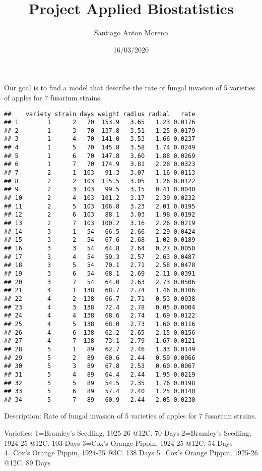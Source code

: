 \documentclass[
]{article}
\title{Project Applied Biostatistics}
\author{Santiago Anton Moreno}
\date{16/03/2020}
\begin{document}
\maketitle

Our goal is to find a model that describe the rate of fungal invasion of
5 varieties of apples for 7 fusarium strains.

\begin{verbatim}
##    variety strain days weight radius radial   rate
## 1        1      2   70  153.9   3.65   1.23 0.0176
## 2        1      3   70  137.8   3.51   1.25 0.0179
## 3        1      4   70  141.0   3.53   1.66 0.0237
## 4        1      5   70  145.8   3.58   1.74 0.0249
## 5        1      6   70  147.8   3.60   1.88 0.0269
## 6        1      7   70  174.9   3.81   2.26 0.0323
## 7        2      1  103   91.3   3.07   1.16 0.0113
## 8        2      2  103  115.5   3.05   1.26 0.0122
## 9        2      3  103   99.5   3.15   0.41 0.0040
## 10       2      4  103  101.2   3.17   2.39 0.0232
## 11       2      5  103  106.8   3.23   2.01 0.0195
## 12       2      6  103   88.1   3.03   1.98 0.0192
## 13       2      7  103  100.2   3.16   2.26 0.0219
## 14       3      1   54   66.5   2.66   2.29 0.0424
## 15       3      2   54   67.6   2.68   1.02 0.0189
## 16       3      3   54   64.8   2.64   0.27 0.0050
## 17       3      4   54   59.3   2.57   2.63 0.0487
## 18       3      5   54   70.1   2.71   2.58 0.0478
## 19       3      6   54   68.1   2.69   2.11 0.0391
## 20       3      7   54   64.0   2.63   2.73 0.0506
## 21       4      1  138   68.7   2.74   1.46 0.0106
## 22       4      2  138   66.7   2.71   0.53 0.0038
## 23       4      3  138   72.4   2.78   0.05 0.0004
## 24       4      4  138   68.6   2.74   1.69 0.0122
## 25       4      5  138   68.0   2.73   1.60 0.0116
## 26       4      6  138   62.2   2.65   2.15 0.0156
## 27       4      7  138   73.1   2.79   1.67 0.0121
## 28       5      1   89   62.7   2.46   1.33 0.0149
## 29       5      2   89   60.6   2.44   0.59 0.0066
## 30       5      3   89   67.8   2.53   0.60 0.0067
## 31       5      4   89   64.4   2.44   1.95 0.0219
## 32       5      5   89   54.5   2.35   1.76 0.0198
## 33       5      6   89   57.4   2.40   1.25 0.0140
## 34       5      7   89   60.9   2.44   2.05 0.0230
\end{verbatim}

Description: Rate of fungal invasion of 5 varieties of apples for 7
fusarium strains.

Varieties: 1=Bramley's Seedling, 1925-26 @12C. 70 Days 2=Bramley's
Seedling, 1924-25 @12C. 103 Days 3=Cox's Orange Pippin, 1924-25 @12C. 54
Days 4=Cox's Orange Pippin, 1924-25 @3C. 138 Days 5=Cox's Orange Pippin,
1925-26 @12C. 89 Days
\end{document}
